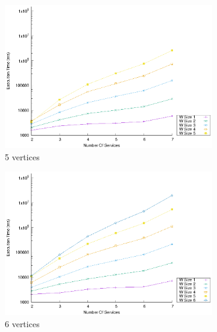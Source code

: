 \begin{figure}[!htb]
\begin{subfigure}{0.48\textwidth}
    \includegraphics[width=\textwidth]{Images/graphs/window_time_performance_qualitative_n7_s7_50_80_n5}
    \caption{5 vertices}
    \label{fig:time_window_perce_wide_5n}
  \end{subfigure}
  \hfill
  \begin{subfigure}{0.48\textwidth}
    \includegraphics[width=\textwidth]{Images/graphs/window_time_performance_qualitative_n7_s7_50_80_n6}
    \caption{6 vertices}
    \label{fig:time_window_perce_wide_6n}
  \end{subfigure}
  \begin{subfigure}{0.48\textwidth}

\end{subfigure}
\end{figure}
